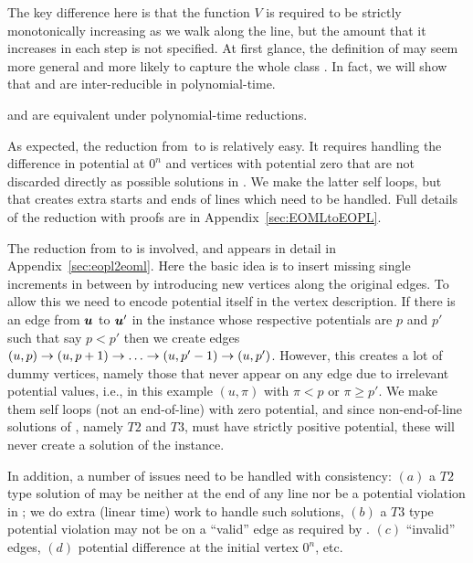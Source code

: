 The key difference here is that the function $V$ is required to be strictly
monotonically increasing as we walk along the line, but the amount that it
increases in each step is not specified.
At first glance, the definition of \EOPL may seem more general and more likely to 
capture the whole class \CLS. In fact, we will show that \EOML and \EOPL are 
inter-reducible in polynomial-time.
%
\begin{theorem}
\EOML and \EOPL are equivalent under polynomial-time reductions.
\end{theorem}
%
As expected, the reduction from~\EOML to \EOPL is relatively easy. It requires
handling the difference in potential at $0^n$ and vertices with potential zero that
are not discarded directly as possible solutions in \EOPL. We make the latter
self loops, but that creates extra starts and ends of lines which need to be
handled. Full details of the reduction with proofs are in
Appendix~\ref{sec:EOMLtoEOPL}.

The reduction from \EOPL to \EOML is involved, and appears in detail in
Appendix~\ref{sec:eopl2eoml}. Here the basic idea is to insert missing single
increments in between by introducing new vertices along the original edges. To
allow this we need to encode potential itself in the vertex description. If
there is an edge from $\mbox{\boldmath $u$}$ to $\mbox{\boldmath $u$}'$ in the \EOPL instance whose respective
potentials are $p$ and $p'$ such that say $p<p'$ then we create edges $(u,p)\ra
(u,p+1)\ra \dots \ra (u,p'-1)\ra (u,p')$. However, this creates a lot of dummy
vertices, namely those that never appear on any edge due to irrelevant potential
values, i.e., in this example $(u,\pi)$ with $\pi <p$ or $\pi\ge p'$. We make
them self loops (not an end-of-line) with zero potential, and since
non-end-of-line solutions of \EOML, namely $T2$ and $T3$, must have strictly
positive potential, these will never create a solution of the \EOML instance.

In addition, a number of issues need to be handled with consistency: $(a)$
a $T2$ type solution of \EOML may be neither at the end of any line nor be a 
potential violation in \EOPL; we do extra (linear time) work to handle such
solutions, $(b)$ a $T3$ type potential violation may not be on a ``valid'' edge as
required by \EOPL. $(c)$ ``invalid'' edges, $(d)$ potential difference at the
initial vertex $0^n$, etc.



